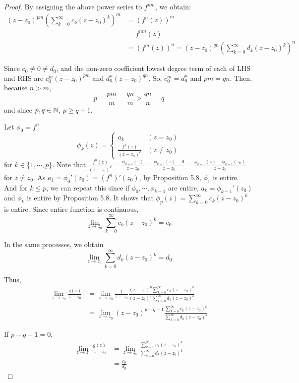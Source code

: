 \begin{proof}
  By assigning the above power series to \(f^{nm}\), we obtain:
  \begin{align*}
    (z - z_0)^{pm} (\sum_{k=0}^{\infty} c_k (z - z_0)^k)^m
    &= (f^n(z))^m
    \\&= f^{nm}(z)
    \\&= (f^m(z))^n
    = (z - z_0)^{qn} (\sum_{k=0}^{\infty} d_k (z - z_0)^k)^n
  \end{align*}

  Since \(c_0 \neq 0 \neq d_0\), and the non-zero coefficient lowest degree term of each of LHS and RHS are \(c_0^m (z-z_0)^{pm}\) and \(d_0^n (z-z_0)^{qn}\).
  So, \(c_0^m = d_0^n\) and \(pm = qn\).
  Then, because \(n > m\),
  \[p = \frac{pm}{m} = \frac{qn}{m} > \frac{qn}{n} = q\]
  and since \(p, q \in \mathbb{N}\), \(p \ge q + 1\).

  Let \(\phi_0 = f^n\)
  \[\phi_{k}(z) = \left\{
    \begin{array}{ll}
      a_k & (z = z_0) \\
      \frac{f^n(z)}{(z - z_0)^k} & (z \neq z_0)
    \end{array}
  \right.\]
  for \(k \in \{1, \cdots, p\}\).
  Note that \(\frac{f^n(z)}{(z - z_0)^k}
  = \frac{\phi_{k - 1}(z)}{z - z_0}
  = \frac{\phi_{k - 1}(z) - 0}{z - z_0}
  = \frac{\phi_{k - 1}(z) - \phi_{k - 1}(z_0)}{z - z_0}\)
  for \(z \neq z_0\).
  As \(a_1 = \phi_0'(z_0) = (f^n)'(z_0)\), by Proposition 5.8, \(\phi_1\) is entire.
  And for \(k \le p\), we can repeat this since if \(\phi_0, \cdots, \phi_{k - 1}\) are entire, \(a_k = \phi_{k - 1}'(z_0)\) and \(\phi_k\) is entire by Proposition 5.8.
  It shows that \(\phi_p(z) = \sum_{k=0}^{\infty} c_k (z - z_0)^k\) is entire.
  Since entire function is continuous,
  \[\lim_{z \to z_0} \sum_{k=0}^{\infty} c_k (z - z_0)^k = c_0\]

  In the same processes, we obtain
  \[\lim_{z \to z_0} \sum_{k=0}^{\infty} d_k (z - z_0)^k = d_0\]

  Thus,
  \begin{align*}
    \lim_{z \to z_0} \frac{g(z)}{z - z_0}
    &= \lim_{z \to z_0}
      \frac{1}{z - z_0}
      \frac{(z - z_0)^p \sum_{k=0}^{\infty} c_k (z - z_0)^k}
      {(z - z_0)^q \sum_{k=0}^{\infty} d_k (z - z_0)^k}
    \\&= \lim_{z \to z_0} (z - z_0)^{p - q - 1}
      \frac{\sum_{k=0}^{\infty} c_k (z - z_0)^k}
      {\sum_{k=0}^{\infty} d_k (z - z_0)^k}
  \end{align*}

  If \(p - q - 1 = 0\),
  \begin{align*}
    \lim_{z \to z_0} \frac{g(z)}{z - z_0}
    &= \lim_{z \to z_0}
      \frac{\sum_{k=0}^{\infty} c_k (z - z_0)^k}
      {\sum_{k=0}^{\infty} d_k (z - z_0)^k}
    \\&= \frac{c_0}{d_0}
  \end{align*}


\end{proof}
